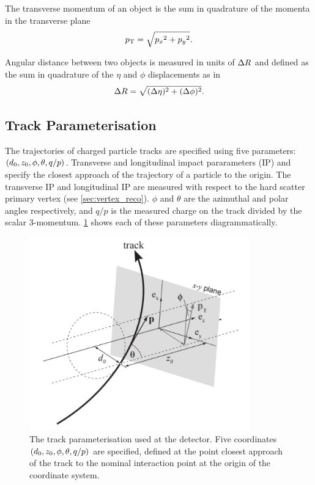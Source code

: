 The transverse momentum \pt of an object is the sum in quadrature of the momenta in the transverse plane
%
\begin{equation}\label{eq:pt}
  p_{\text{T}} = \sqrt{ {p_x}^2 + {p_y}^2 } .
\end{equation}

Angular distance between two objects is measured in units of $\Delta R$ and defined as the sum in quadrature of the $\eta$ and $\phi$ displacements as in
%
\begin{equation}\label{eq:delta_r}
  \Delta R = \sqrt{(\Delta\eta)^{2} + (\Delta\phi)^{2}} .
\end{equation}
%



\subsection{Track Parameterisation}\label{sec:track_parameterisation}

The trajectories of charged particle tracks are specified using five parameters: $(d_{0}, z_{0}, \phi, \theta, q/p)$.
Transverse and longitudinal impact pararameters (IP) \dzero and \zzero specify the closest approach of the trajectory of a particle to the origin.
The transverse IP \dzero and longitudinal IP \zzero are measured with respect to the hard scatter primary vertex (see \cref{sec:vertex_reco}).
$\phi$ and $\theta$ are the azimuthal and polar angles respectively, and $q/p$ is the measured charge on the track divided by the scalar 3-momentum.
\cref{fig:track_params} shows each of these parameters diagrammatically.

\begin{figure}[!htbp]
  \centering
  \includegraphics[width=0.85\textwidth]{chapters/2.detector/figs/track_params.pdf}
  \caption{
    The track parameterisation used at the \ATLAS detector.
    Five coordinates $(d_{0}, z_{0}, \phi, \theta, q/p)$ are specified, defined at the point closest approach of the track to the nominal interaction point at the origin of the coordinate system.
  }
  \label{fig:track_params}
\end{figure}

